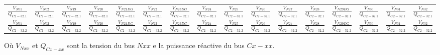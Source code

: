 \begin{table}[H]
{\begin{tabular}{cccccccccccccccc}
			$\frac{V_{N01}}{Q_{C 2-32.1}}$& $\frac{V_{N02}}{Q_{C 2-32.1}}$& $\frac{V_{N19}}{Q_{C 2-32.1}}$& $\frac{V_{N20}}{Q_{C 2-32.1}}$& $\frac{V_{N21 DG}}{Q_{C 2-32.1}}$& $\frac{V_{N22}}{Q_{C 2-32.1}}$& $\frac{V_{N23 DG}}{Q_{C 2-32.1}}$& $\frac{V_{N24}}{Q_{C 2-32.1}}$& $\frac{V_{N25}}{Q_{C 2-32.1}}$& $\frac{V_{N26}}{Q_{C 2-32.1}}$&$\frac{V_{N27}}{Q_{C 2-32.1}}$&$\frac{V_{N28}}{Q_{C 2-32.1}}$&$\frac{V_{N29 DG}}{Q_{C 2-32.1}}$&$\frac{V_{N30}}{Q_{C 2-32.1}}$&$\frac{V_{N31}}{Q_{C 2-32.1}}$&$\frac{V_{N32}}{Q_{C 2-32.1}}$\\
			
			$\frac{V_{N01}}{Q_{C 2-32.2}}$& $\frac{V_{N02}}{Q_{C 2-32.2}}$& $\frac{V_{N19}}{Q_{C 2-32.2}}$& $\frac{V_{N20}}{Q_{C 2-32.2}}$& $\frac{V_{N21 DG}}{Q_{C 2-32.2}}$& $\frac{V_{N22}}{Q_{C 2-32.2}}$& $\frac{V_{N23 DG}}{Q_{C 2-32.2}}$& $\frac{V_{N24}}{Q_{C 2-32.2}}$& $\frac{V_{N25}}{Q_{C 2-32.2}}$& $\frac{V_{N26}}{Q_{C 2-32.2}}$&$\frac{V_{N27}}{Q_{C 2-32.2}}$&$\frac{V_{N28}}{Q_{C 2-32.2}}$&$\frac{V_{N29 DG}}{Q_{C 2-32.2}}$&$\frac{V_{N30}}{Q_{C 2-32.2}}$&$\frac{V_{N31}}{Q_{C 2-32.2}}$&$\frac{V_{N32}}{Q_{C 2-32.2}}$\\
	\end{tabular}}
	
	
\end{table}


Où $ V_{Nxx} $ et $ Q_{Cx-xx} $ sont la tension du bus $ Nxx $ e la puissance réactive du bus $ Cx-xx $.

